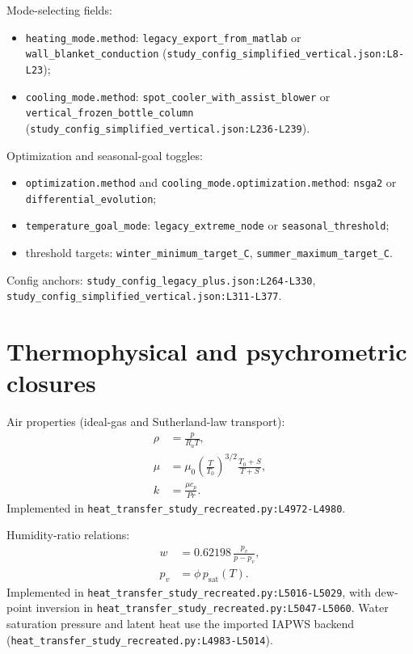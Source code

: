 \documentclass[11pt]{article}
\newcommand{\srcref}[1]{\nolinkurl{#1}}
\newcommand{\code}[1]{\nolinkurl{#1}}
\begin{document}
Mode-selecting fields:
\begin{itemize}[leftmargin=*]
\item \code{heating\_mode.method}:
\code{legacy\_export\_from\_matlab} or \code{wall\_blanket\_conduction}
(\srcref{study_config_simplified_vertical.json:L8-L23});
\item \code{cooling\_mode.method}:
\code{spot\_cooler\_with\_assist\_blower} or
\code{vertical\_frozen\_bottle\_column}
(\srcref{study_config_simplified_vertical.json:L236-L239}).
\end{itemize}

Optimization and seasonal-goal toggles:
\begin{itemize}[leftmargin=*]
\item \code{optimization.method} and \code{cooling\_mode.optimization.method}:
\code{nsga2} or \code{differential\_evolution};
\item \code{temperature\_goal\_mode}:
\code{legacy\_extreme\_node} or \code{seasonal\_threshold};
\item threshold targets:
\code{winter\_minimum\_target\_C}, \code{summer\_maximum\_target\_C}.
\end{itemize}
Config anchors:
\srcref{study_config_legacy_plus.json:L264-L330},
\srcref{study_config_simplified_vertical.json:L311-L377}.

\section{Thermophysical and psychrometric closures}
Air properties (ideal-gas and Sutherland-law transport):
\begin{align}
\rho &= \frac{p}{R_a T}, \\
\mu &= \mu_0\left(\frac{T}{T_0}\right)^{3/2}\frac{T_0+S}{T+S}, \\
k &= \frac{\mu c_p}{Pr}.
\end{align}
Implemented in \srcref{heat_transfer_study_recreated.py:L4972-L4980}.

Humidity-ratio relations:
\begin{align}
w &= 0.62198\,\frac{p_v}{p-p_v}, \\
p_v &= \phi\,p_{\mathrm{sat}}(T).
\end{align}
Implemented in
\srcref{heat_transfer_study_recreated.py:L5016-L5029},
with dew-point inversion in
\srcref{heat_transfer_study_recreated.py:L5047-L5060}.
Water saturation pressure and latent heat use the imported IAPWS backend
(\srcref{heat_transfer_study_recreated.py:L4983-L5014}).
\end{document}
